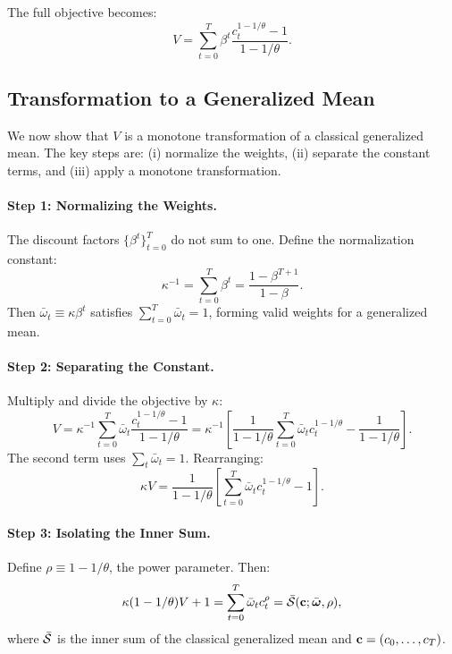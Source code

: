The full objective becomes:
\begin{equation}
V = \sum_{t=0}^{T} \beta^t \frac{c_t^{1-1/\theta} - 1}{1 - 1/\theta}.
\label{eq:full-objective}
\end{equation}

\subsection{Transformation to a Generalized Mean}
\label{subsec:transformation-mean}

We now show that $V$ is a monotone transformation of a classical generalized mean. The key steps are: (i) normalize the weights, (ii) separate the constant terms, and (iii) apply a monotone transformation.

\paragraph{Step 1: Normalizing the Weights.}
The discount factors $\{\beta^t\}_{t=0}^{T}$ do not sum to one. Define the normalization constant:
\begin{equation}
\kappa^{-1} = \sum_{t=0}^{T} \beta^t = \frac{1 - \beta^{T+1}}{1 - \beta}.
\label{eq:kappa-def}
\end{equation}
Then $\bar{\omega}_t \equiv \kappa \beta^t$ satisfies $\sum_{t=0}^{T} \bar{\omega}_t = 1$, forming valid weights for a generalized mean.

\paragraph{Step 2: Separating the Constant.}
Multiply and divide the objective by $\kappa$:
\begin{equation}
V = \kappa^{-1} \sum_{t=0}^{T} \bar{\omega}_t \frac{c_t^{1-1/\theta} - 1}{1 - 1/\theta} = \kappa^{-1} \left[ \frac{1}{1 - 1/\theta} \sum_{t=0}^{T} \bar{\omega}_t c_t^{1-1/\theta} - \frac{1}{1 - 1/\theta} \right].
\label{eq:separate-constant}
\end{equation}
The second term uses $\sum_t \bar{\omega}_t = 1$. Rearranging:
\begin{equation}
\kappa V = \frac{1}{1 - 1/\theta} \left[ \sum_{t=0}^{T} \bar{\omega}_t c_t^{1-1/\theta} - 1 \right].
\label{eq:rearranged}
\end{equation}

\paragraph{Step 3: Isolating the Inner Sum.}
Define $\rho \equiv 1 - 1/\theta$, the power parameter. Then:
\begin{equation}
\kappa (1 - 1/\theta) V + 1 = \sum_{t=0}^{T} \bar{\omega}_t c_t^{\rho} = \bar{\mathcal{S}}(\mathbf{c}; \bar{\boldsymbol{\omega}}, \rho),
\label{eq:inner-sum-isolated}
\end{equation}
where $\bar{\mathcal{S}}$ is the inner sum of the classical generalized mean and $\mathbf{c} = (c_0, \ldots, c_T)$.


